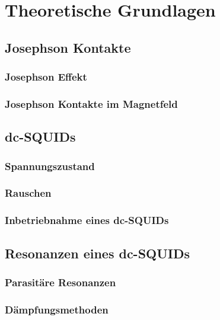 \chapter{Theoretische Grundlagen}


\section{Josephson Kontakte}

\subsection{Josephson Effekt}

\subsection{Josephson Kontakte im Magnetfeld}


\section{dc-SQUIDs}

\subsection{Spannungszustand}

\subsection{Rauschen}

\subsection{Inbetriebnahme eines dc-SQUIDs}


\section{Resonanzen eines dc-SQUIDs}

\subsection{Parasitäre Resonanzen}

\subsection{Dämpfungsmethoden}


